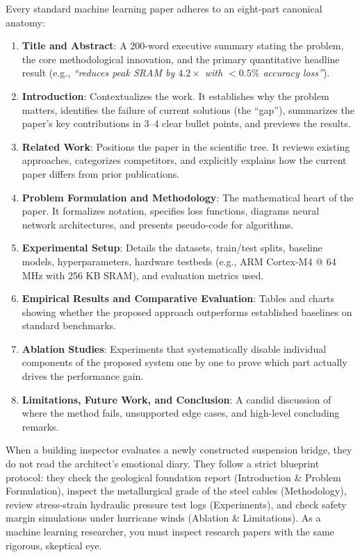 Every standard machine learning paper adheres to an eight-part canonical anatomy:

\begin{enumerate}
    \item \textbf{Title and Abstract}: A 200-word executive summary stating the problem, the core methodological innovation, and the primary quantitative headline result (e.g., \textit{``reduces peak SRAM by $4.2\times$ with $< 0.5\%$ accuracy loss''}).
    \item \textbf{Introduction}: Contextualizes the work. It establishes why the problem matters, identifies the failure of current solutions (the ``gap''), summarizes the paper's key contributions in 3--4 clear bullet points, and previews the results.
    \item \textbf{Related Work}: Positions the paper in the scientific tree. It reviews existing approaches, categorizes competitors, and explicitly explains how the current paper differs from prior publications.
    \item \textbf{Problem Formulation and Methodology}: The mathematical heart of the paper. It formalizes notation, specifies loss functions, diagrams neural network architectures, and presents pseudo-code for algorithms.
    \item \textbf{Experimental Setup}: Details the datasets, train/test splits, baseline models, hyperparameters, hardware testbeds (e.g., ARM Cortex-M4 @ 64 MHz with 256 KB SRAM), and evaluation metrics used.
    \item \textbf{Empirical Results and Comparative Evaluation}: Tables and charts showing whether the proposed approach outperforms established baselines on standard benchmarks.
    \item \textbf{Ablation Studies}: Experiments that systematically disable individual components of the proposed system one by one to prove which part actually drives the performance gain.
    \item \textbf{Limitations, Future Work, and Conclusion}: A candid discussion of where the method fails, unsupported edge cases, and high-level concluding remarks.
\end{enumerate}

\begin{analogy}
When a building inspector evaluates a newly constructed suspension bridge, they do not read the architect's emotional diary. They follow a strict blueprint protocol: they check the geological foundation report (Introduction \& Problem Formulation), inspect the metallurgical grade of the steel cables (Methodology), review stress-strain hydraulic pressure test logs (Experiments), and check safety margin simulations under hurricane winds (Ablation \& Limitations). As a machine learning researcher, you must inspect research papers with the same rigorous, skeptical eye.
\end{analogy}

